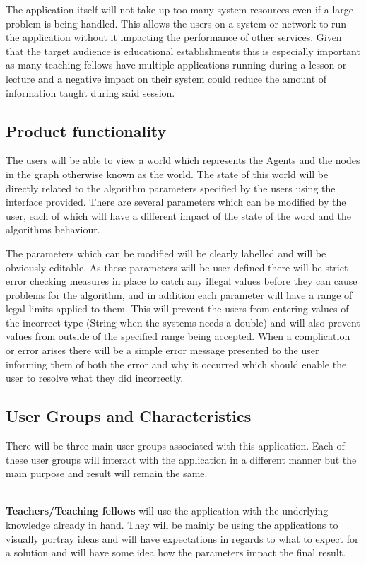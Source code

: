 The application itself will not take up too many system resources even if a large problem is being handled. This allows the users on a system or network to run the application without it impacting the performance of other services. Given that the target audience is educational establishments this is especially important as many teaching fellows have multiple applications running during a lesson or lecture and a negative impact on their system could reduce the amount of information taught during said session.

\subsection{Product functionality}

The users will be able to view a world which represents the Agents and the nodes in the graph otherwise known as the world. The state of this world will be directly related to the algorithm parameters specified by the users using the interface provided. There are several parameters which can be modified by the user, each of which will have a different impact of the state of the word and the algorithms behaviour.

The parameters which can be modified will be clearly labelled and will be obviously editable. As these parameters will be user defined there will be strict error checking measures in place to catch any illegal values before they can cause problems for the algorithm, and in addition each parameter will have a range of legal limits applied to them. This will prevent the users from entering values of the incorrect type (String when the systems needs a double) and will also prevent values from outside of the specified range being accepted. When a complication or error arises there will be a simple error message presented to the user informing them of both the error and why it occurred which should enable the user to resolve what they did incorrectly.

\subsection{User Groups and Characteristics}
\label{ssec:usergroups}
There will be three main user groups associated with this application. Each of these user groups will interact with the application in a different manner but the main purpose and result will remain the same.

\noindent \\
\textbf{Teachers/Teaching fellows} will use the application with the underlying knowledge already in hand. They will be mainly be using the applications to visually portray ideas and will have expectations in regards to what to expect for a solution and will have some idea how the parameters impact the final result.


